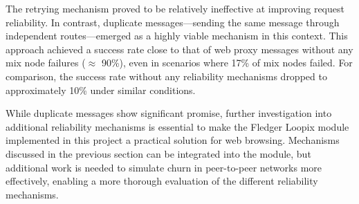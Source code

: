 \documentclass[a4paper,11pt,oneside]{report}
\begin{document}
The retrying mechanism proved to be relatively ineffective at improving request reliability. In contrast, duplicate messages—sending the same message through independent routes—emerged as a highly viable mechanism in this context. This approach achieved a success rate close to that of web proxy messages without any mix node failures (\(\approx\) 90\%), even in scenarios where 17\% of mix nodes failed. For comparison, the success rate without any reliability mechanisms dropped to approximately 10\% under similar conditions.

While duplicate messages show significant promise, further investigation into additional reliability mechanisms is essential to make the Fledger Loopix module implemented in this project a practical solution for web browsing. 
Mechanisms discussed in the previous section can be integrated into the module, but additional work is needed to simulate churn in peer-to-peer networks more effectively, enabling a more thorough evaluation of the different reliability mechanisms.



\cleardoublepage
{}
{}
\printbibliography

%
%
\end{document}
